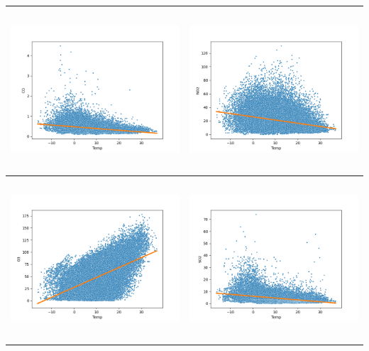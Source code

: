 \documentclass[18pt, letterpaper]{article}
\begin{document}
\begin{table}[H]
\centering
\begin{tabular}{|c|c|}
\hline
\includegraphics[width=80mm,height=60mm]{visualisations/corr_plots/TempxCO_scatter.png}  & \includegraphics[width=80mm,height=60mm]{visualisations/corr_plots/TempxNO2_scatter.png} \\ \hline
\includegraphics[width=80mm,height=60mm]{visualisations/corr_plots/TempxO3_scatter.png}  & \includegraphics[width=80mm,height=60mm]{visualisations/corr_plots/TempxSO2_scatter.png} \\ \hline

\end{tabular}
\end{table}
\end{document}
